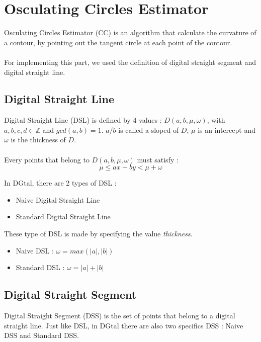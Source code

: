\section{Osculating Circles Estimator}

Osculating Circles Estimator (CC) is an algorithm that calculate the curvature of a contour, by pointing out the tangent circle at each point of the contour. 

\paragraph{}
For implementing this part, we used the definition of digital straight segment and digital straight line. 

\subsection{Digital Straight Line}
Digital Straight Line (DSL) is defined by 4 values : $D(a, b, \mu, \omega)$, with $a, b, c, d \in \mathbb{Z}$ and $gcd(a, b) = 1$. $a/b$ is called a sloped of $D$, $\mu$ is an intercept and $\omega$ is the thickness of $D$.

\paragraph{}
Every points that belong to $D(a, b, \mu, \omega)$ must satisfy :
$$
\mu \leq ax-by < \mu + \omega
$$

In DGtal, there are 2 types of DSL :
\begin{itemize}
\item Naive Digital Straight Line
\item Standard Digital Straight Line
\end{itemize}

These type of DSL is made by specifying the value \textit{thickness}. 

\begin{itemize}
\item Naive DSL : $\omega = max(|a|, |b|)$
\item Standard DSL : $\omega = |a| + |b|$
\end{itemize}

\subsection{Digital Straight Segment}
Digital Straight Segment (DSS) is the set of points that belong to a digital straight line. Just like DSL, in DGtal there are also two specifics DSS : Naive DSS and Standard DSS.

